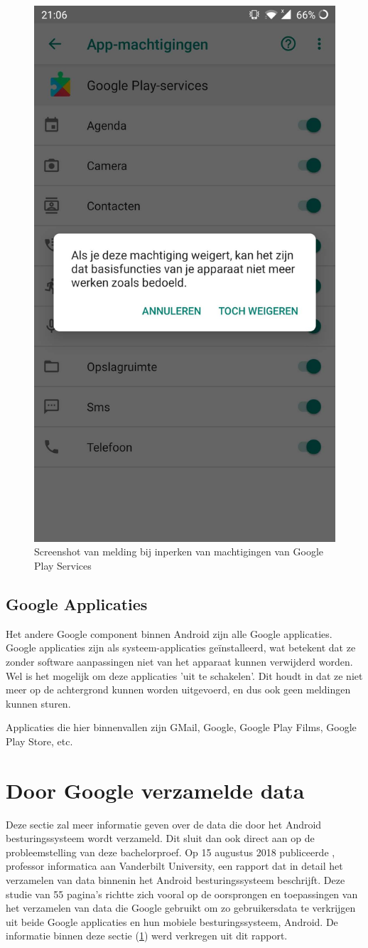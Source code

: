 \begin{figure}
    \centering
    \includegraphics[width=0.4\linewidth]{img/machtigingen_melding.jpg}
    \caption{Screenshot van melding bij inperken van machtigingen van Google Play Services}
    \label{fig:permissions2}
\end{figure}

\subsection{Google Applicaties}
Het andere Google component binnen Android zijn alle Google applicaties. Google applicaties zijn als systeem-applicaties geïnstalleerd, wat betekent dat ze zonder software aanpassingen niet van  het apparaat kunnen verwijderd worden. Wel is het mogelijk om deze applicaties 'uit te schakelen'. Dit houdt in dat ze niet meer op de achtergrond kunnen worden uitgevoerd, en dus ook geen meldingen kunnen sturen.

Applicaties die hier binnenvallen zijn GMail, Google, Google Play Films, Google Play Store, etc.

\section{Door Google verzamelde data}
\label{collected_data}

Deze sectie zal meer informatie geven over de data die door het Android besturingssysteem wordt verzameld. Dit sluit dan ook direct aan op de probleemstelling van deze bachelorproef. Op 15 augustus 2018 publiceerde \textcite{schmidt_google-data-collection}, professor informatica aan Vanderbilt University, een rapport dat in detail het verzamelen van data binnenin het Android besturingssysteem beschrijft. Deze studie van 55 pagina's richtte zich vooral op de oorsprongen en toepassingen van het verzamelen van data die Google gebruikt om zo gebruikersdata te verkrijgen uit beide Google applicaties en hun mobiele besturingssysteem, Android. De informatie binnen deze sectie (\ref{collected_data}) werd verkregen uit dit rapport.


